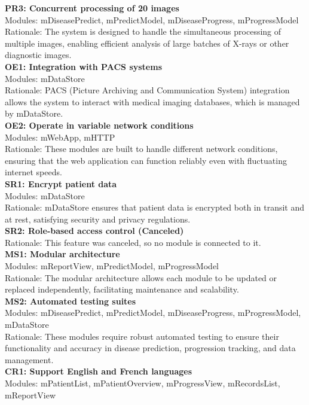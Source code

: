 \documentclass[12pt, titlepage]{article}
\begin{document}
\textbf{PR3: Concurrent processing of 20 images} \\
Modules: mDiseasePredict, mPredictModel, mDiseaseProgress, mProgressModel \\
Rationale: The system is designed to handle the simultaneous processing of multiple images, enabling efficient analysis of large batches of X-rays or other diagnostic images. \\
\textbf{OE1: Integration with PACS systems} \\
Modules: mDataStore \\
Rationale: PACS (Picture Archiving and Communication System) integration allows the system to interact with medical imaging databases, which is managed by mDataStore. \\
\textbf{OE2: Operate in variable network conditions} \\
Modules: mWebApp, mHTTP \\
Rationale: These modules are built to handle different network conditions, ensuring that the web application can function reliably even with fluctuating internet speeds. \\
\textbf{SR1: Encrypt patient data} \\
Modules: mDataStore \\
Rationale: mDataStore ensures that patient data is encrypted both in transit and at rest, satisfying security and privacy regulations. \\
\textbf{SR2: Role-based access control (Canceled)} \\
Rationale: This feature was canceled, so no module is connected to it. \\
\textbf{MS1: Modular architecture} \\
Modules: mReportView, mPredictModel, mProgressModel \\
Rationale: The modular architecture allows each module to be updated or replaced independently, facilitating maintenance and scalability. \\
\textbf{MS2: Automated testing suites} \\
Modules: mDiseasePredict, mPredictModel, mDiseaseProgress, mProgressModel, mDataStore \\
Rationale: These modules require robust automated testing to ensure their functionality and accuracy in disease prediction, progression tracking, and data management. \\
\textbf{CR1: Support English and French languages} \\
Modules: mPatientList, mPatientOverview, mProgressView, mRecordsList, mReportView \\
\end{document}
